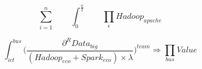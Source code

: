 \documentclass{article}
\begin{document}
\begin{equation*}
\sum_{i=1}^n \qquad
\int_0^{\frac{\pi}{2}} 
\qquad
\prod_{\epsilon}Hadoop_{apache}
\end{equation*}

$$
  \int_{ict}^{bus}
\Bigg(
      \dfrac
        {
          \partial^R{Data_{big}}
        }
        {
          (Hadoop_{eco} + Spark_{eco})
            \times
          {\lambda}
        }
\Bigg)
  ^
{team}
\Rightarrow
  \prod_{bus}
  Value
$$
\end{document}
